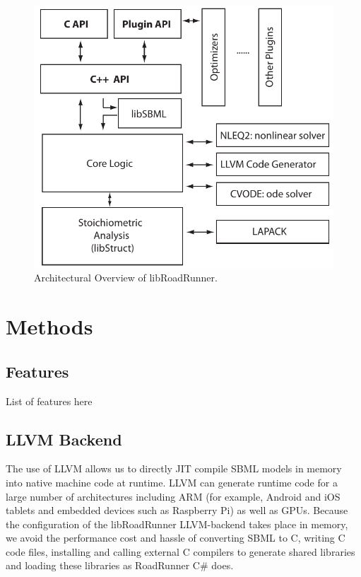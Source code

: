 \documentclass{bioinfo}
\begin{document}
\begin{figure}[!htpb]%
\centerline{\includegraphics[scale=0.55]{roadRunnerOverview.pdf}}
\caption{Architectural Overview of libRoadRunner.}\label{fig:01}
\end{figure}

\section{Methods}

\subsection{Features}

List of features here

\subsection{LLVM Backend}

The use of LLVM allows us to directly JIT compile SBML models in memory into native machine code at runtime. LLVM can generate runtime code for a large number of architectures including ARM (for example, Android and iOS tablets and embedded devices such as Raspberry Pi) as well as GPUs. Because the configuration of the libRoadRunner LLVM-backend takes place in memory, we avoid the performance cost and hassle of converting SBML to C, writing C code files, installing and calling external C compilers to generate shared libraries and loading these libraries as RoadRunner C\# does.  
\end{document}
